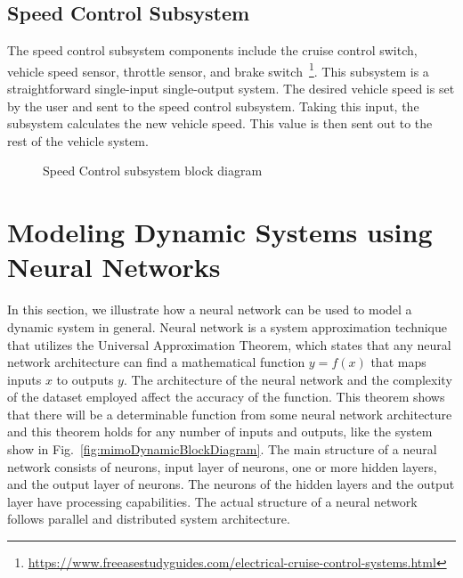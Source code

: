 \documentclass[journal,twoside,web]{ieeecolor}
\begin{document}
  \subsection{Speed Control Subsystem}
  The speed control subsystem components include the cruise control switch, vehicle speed sensor, throttle sensor, and brake switch~\footnote{\url{https://www.freeasestudyguides.com/electrical-cruise-control-systems.html}}. This subsystem is a straightforward single-input single-output system. The desired vehicle speed is set by the user and sent to the speed control subsystem. Taking this input, the subsystem calculates the new vehicle speed. This value is then sent out to the rest of the vehicle system. 
 \begin{figure}[htbp]
    \centering
    \caption{Speed Control subsystem block diagram}
    \label{fig:speedControlModelArchitecture}
 \end{figure}



 \section{Modeling Dynamic Systems using Neural Networks}

 In this section, we illustrate how a neural network can be used to model a
 dynamic system in general. Neural network is a system approximation technique
 that utilizes the Universal Approximation Theorem, which states that any neural network architecture
 can find a mathematical function $y=f(x)$ that maps inputs $x$ to outputs $y$. The architecture of the 
 neural network and the complexity of the dataset employed affect the accuracy of the function. This theorem
 shows that there will be a determinable function from some neural network architecture and this theorem holds
 for any number of inputs and outputs, like the system show in Fig.~\ref{fig:mimoDynamicBlockDiagram}. 
 The main structure of a neural network consists of neurons, input layer of
 neurons, one or more hidden layers, and the output layer of neurons. The
 neurons of the hidden layers and the output layer have processing capabilities.
 The actual structure of a neural network follows parallel and distributed system
 architecture.
\end{document}
